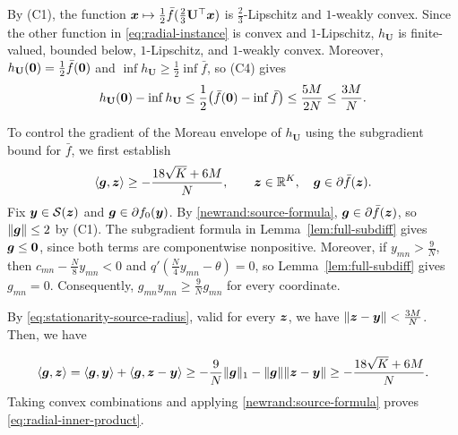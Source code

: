 By \textnormal{(C1)}, the function
$\bm{x}\mapsto\tfrac12\bar f(\tfrac23\mathbf U^\top\bm{x})$
is $\tfrac23$-Lipschitz and $1$-weakly convex.
Since the other function in \eqref{eq:radial-instance}
is convex and $1$-Lipschitz, $h_{\mathbf U}$ is
finite-valued, bounded below, $1$-Lipschitz,
and $1$-weakly convex.  Moreover, $h_{\mathbf U}({\mathbf 0})=\tfrac12\bar f({\mathbf 0})$
and $\inf h_{\mathbf U}\ge\tfrac12\inf\bar f$,
so \textnormal{(C4)} gives
\[
 h_{\mathbf U}({\mathbf 0})-\inf h_{\mathbf U}
 \le\frac12\bigl(\bar f({\mathbf 0})-\inf\bar f\bigr)
 \le\frac{5M}{2N}\le\frac{3M}{N}.
\] 

To control the gradient of the Moreau envelope of
$h_{\mathbf U}$ using the subgradient bound for
$\bar f$, we first establish
\begin{equation}
 \langle\bm{g},\bm{z}\rangle
 \ge-\frac{18\sqrt K+6M}{N},
 \qquad
 \bm{z}\in{\mathbb{R}}^K,\quad \bm{g}\in\partial\bar f(\bm{z}).
 \label{eq:radial-inner-product}
\end{equation}
Fix $\bm{y}\in\mathcal S(\bm{z})$ and
$\bm{g}\in\partial f_0(\bm{y})$.
By \eqref{newrand:source-formula},
$\bm{g}\in\partial\bar f(\bm{z})$, so
$\|\bm{g}\|\le2$ by \textnormal{(C1)}.
The subgradient formula in
Lemma~\ref{lem:full-subdiff} gives $\bm{g}\le{\mathbf 0}$,
since both terms are componentwise nonpositive. Moreover, if $y_{mn}>\tfrac9N$, then
$c_{mn}-\tfrac N8y_{mn}<0$ and
$q'(\tfrac N4y_{mn}-\theta)=0$,
so Lemma~\ref{lem:full-subdiff} gives $g_{mn}=0$.
Consequently,
$g_{mn}y_{mn}\ge\tfrac9N g_{mn}$ for every coordinate.

By \eqref{eq:stationarity-source-radius}, valid for
every $\bm{z}$, we have $\|\bm{z}-\bm{y}\|<\tfrac{3M}{N}$. Then, we have 

\[
\begin{aligned}
 \langle\bm{g},\bm{z}\rangle
=\langle\bm{g},\bm{y}\rangle+\langle\bm{g},\bm{z}-\bm{y}\rangle
 \ge-\frac9N\|\bm{g}\|_1-\|\bm{g}\|\|\bm{z}-\bm{y}\|\ge-\frac{18\sqrt K+6M}{N}.
\end{aligned}
\]
Taking convex combinations and applying
\eqref{newrand:source-formula} proves
\eqref{eq:radial-inner-product}.

